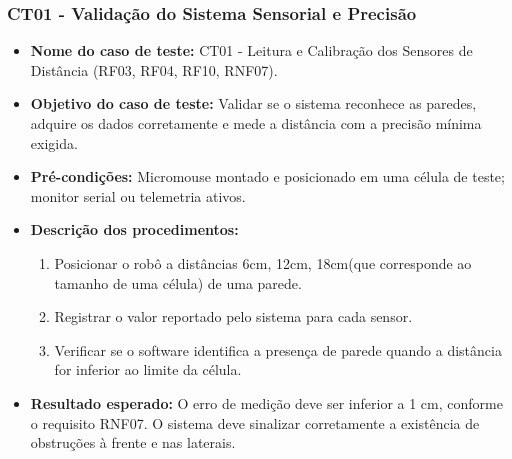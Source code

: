     \subsubsection{CT01 - Validação do Sistema Sensorial e Precisão}
    \begin{itemize}
        \item \textbf{Nome do caso de teste:} CT01 - Leitura e Calibração dos Sensores de Distância (RF03, RF04, RF10, RNF07).
        \item \textbf{Objetivo do caso de teste:} Validar se o sistema reconhece as paredes, adquire os dados corretamente e mede a distância com a precisão mínima exigida.
        \item \textbf{Pré-condições:} Micromouse montado e posicionado em uma célula de teste; monitor serial ou telemetria ativos.
        \item \textbf{Descrição dos procedimentos:}
        \begin{enumerate}
            \item Posicionar o robô a distâncias 6cm, 12cm, 18cm(que corresponde ao tamanho de uma célula) de uma parede.
            \item Registrar o valor reportado pelo sistema para cada sensor.
            \item Verificar se o software identifica a presença de parede quando a distância for inferior ao limite da célula.
        \end{enumerate}
        \item \textbf{Resultado esperado:} O erro de medição deve ser inferior a 1 cm, conforme o requisito RNF07. O sistema deve sinalizar corretamente a existência de obstruções à frente e nas laterais.
    \end{itemize}

